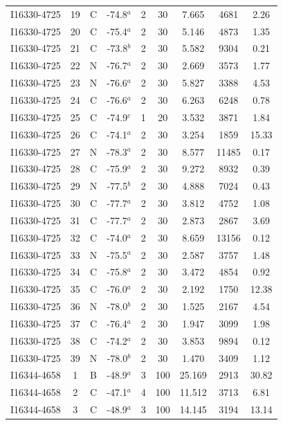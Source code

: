 \begin{table}
\begin{tabular}{ccccccccc}
I16330-4725 & 19 & C & -74.8$^{a}$ & 2 & 30 & 7.665 & 4681 & 2.26 \\
I16330-4725 & 20 & C & -75.4$^{a}$ & 2 & 30 & 5.146 & 4873 & 1.35 \\
I16330-4725 & 21 & C & -73.8$^{b}$ & 2 & 30 & 5.582 & 9304 & 0.21 \\
I16330-4725 & 22 & N & -76.7$^{a}$ & 2 & 30 & 2.669 & 3573 & 1.77 \\
I16330-4725 & 23 & N & -76.6$^{a}$ & 2 & 30 & 5.827 & 3388 & 4.53 \\
I16330-4725 & 24 & C & -76.6$^{a}$ & 2 & 30 & 6.263 & 6248 & 0.78 \\
I16330-4725 & 25 & C & -74.9$^{c}$ & 1 & 20 & 3.532 & 3871 & 1.84 \\
I16330-4725 & 26 & C & -74.1$^{a}$ & 2 & 30 & 3.254 & 1859 & 15.33 \\
I16330-4725 & 27 & N & -78.3$^{a}$ & 2 & 30 & 8.577 & 11485 & 0.17 \\
I16330-4725 & 28 & C & -75.9$^{a}$ & 2 & 30 & 9.272 & 8932 & 0.39 \\
I16330-4725 & 29 & N & -77.5$^{b}$ & 2 & 30 & 4.888 & 7024 & 0.43 \\
I16330-4725 & 30 & C & -77.7$^{a}$ & 2 & 30 & 3.812 & 4752 & 1.08 \\
I16330-4725 & 31 & C & -77.7$^{a}$ & 2 & 30 & 2.873 & 2867 & 3.69 \\
I16330-4725 & 32 & C & -74.0$^{a}$ & 2 & 30 & 8.659 & 13156 & 0.12 \\
I16330-4725 & 33 & N & -75.5$^{a}$ & 2 & 30 & 2.587 & 3757 & 1.48 \\
I16330-4725 & 34 & C & -75.8$^{a}$ & 2 & 30 & 3.472 & 4854 & 0.92 \\
I16330-4725 & 35 & C & -76.0$^{a}$ & 2 & 30 & 2.192 & 1750 & 12.38 \\
I16330-4725 & 36 & N & -78.0$^{b}$ & 2 & 30 & 1.525 & 2167 & 4.54 \\
I16330-4725 & 37 & C & -76.4$^{a}$ & 2 & 30 & 1.947 & 3099 & 1.98 \\
I16330-4725 & 38 & C & -74.2$^{a}$ & 2 & 30 & 3.853 & 9894 & 0.12 \\
I16330-4725 & 39 & N & -78.0$^{b}$ & 2 & 30 & 1.470 & 3409 & 1.12 \\
I16344-4658 & 1 & B & -48.9$^{a}$ & 3 & 100 & 25.169 & 2913 & 30.82 \\
I16344-4658 & 2 & C & -47.1$^{a}$ & 4 & 100 & 11.512 & 3713 & 6.81 \\
I16344-4658 & 3 & C & -48.9$^{a}$ & 3 & 100 & 14.145 & 3194 & 13.14 \\

\end{tabular}
\end{table}
